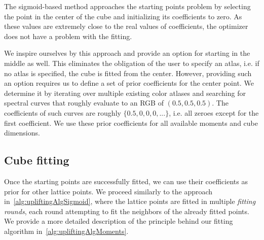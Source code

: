 The sigmoid-based method approaches the starting points problem by selecting the point in the center of the cube and initializing its coefficients to zero. As these values are extremely close to the real values of coefficients, the optimizer does not have a problem with the fitting.

We inspire ourselves by this approach and provide an option for starting in the middle as well. This eliminates the obligation of the user to specify an atlas, i.e. if no atlas is specified, the cube is fitted from the center. However, providing such an option requires us to define a set of prior coefficients for the center point. We determine it by iterating over multiple existing color atlases and searching for spectral curves that roughly evaluate to an RGB of $(0.5, 0.5, 0.5)$. The coefficients of such curves are roughly $\{0.5, 0, 0, 0, ... \}$, i.e. all zeroes except for the first coefficient. We use these prior coefficients for all available moments and cube dimensions.

\subsection{Cube fitting}
Once the starting points are successfully fitted, we can use their coefficients as prior for other lattice points. We proceed similarly to the approach in~\cref{alg:upliftingAlgSigmoid}, where the lattice points are fitted in multiple \emph{fitting rounds}, each round attempting to fit the neighbors of the already fitted points. We provide a more detailed description of the principle behind our fitting algorithm in~\cref{alg:upliftingAlgMoments}.


